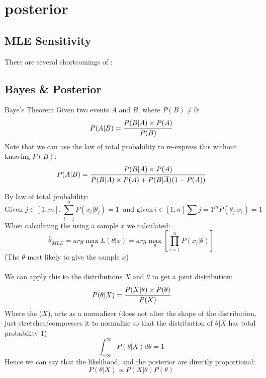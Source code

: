 \chapter{posterior}

\section{MLE Sensitivity}
There are several shortcomings of :
\begin{itemize}
\end{itemize}

\section{Bayes \& Posterior}
\begin{definitionbox}{Baye's Theorem}
	Given two events $A$ and $B$, where $P(B) \neq 0$:
	\[P(A|B) = \cfrac{P(B|A) \times P(A)}{P(B)}\]
	Note that we can use the law of total probability to re-express this without knowing $P(B)$:
	\[P(A|B) = \cfrac{P(B|A) \times P(A)}{P(B|A) \times P(A) + P(B|\overline{A})(1 - P(A))}\]
\end{definitionbox}
By law of total probability:
\[\text{Given } j \in [1,m]. \ \sum_{i=1}^nP(x_i|\theta_j) = 1 \ \text{ and given} \ i \in [1,n] \sum{j = 1}^mP(\theta_j|x_i) = 1\]
When calculating the  using a sample $\underline{x}$ we calculated:
\[\hat{\theta}_{MLE} = arg \max_{\theta} L(\theta|\underline{x}) = arg \max_{\theta} \left[ \prod_{i=1}^n P(x_i|\theta) \right]\]
(The $\theta$ most likely to give the sample $\underline{x}$)
\\
\\ We can apply this to the distributions $X$ and $\theta$ to get a joint distribution:
\[P(\theta|X) = \cfrac{P(X|\theta)\times P(\theta)}{P(X)}\]
Where the  ($X$), acts as a normalizer (does not alter the shape of the distribution, just stretches/compresses it to normalize so that the distribution of $\theta|X$ has total probability $1$)
\[\int_{-\infty}^{\infty}P(\theta|X)d\theta = 1\]
Hence we can say that the likelihood, and the posterior are directly proportional:
\[P(\theta|X) \varpropto P(X|\theta)P(\theta)\]
